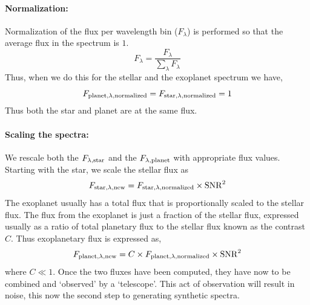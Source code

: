 \paragraph{Normalization:}
Normalization of the flux per wavelength bin ($F_\lambda$) is performed so that the average flux in the spectrum is $1$.
\begin{equation}
    F_\lambda = \dfrac{F_\lambda}{\sum\limits_{\lambda} F_{\lambda}}
\end{equation}
Thus, when we do this for the stellar and the exoplanet spectrum we have,
\begin{equation}
     F_{\rm{planet,\lambda,normalized}} =  F_{\rm{star},\lambda,normalized} = 1
\end{equation}
Thus both the star and planet are at the same flux. 
\paragraph{Scaling the spectra:}
We rescale both the $F_{\rm{\lambda,star}}$ and the $F_{\rm{\lambda,planet}}$ with appropriate flux values.
Starting with the star, we scale the stellar flux as
\begin{equation}
    F_{\rm{star,\lambda,new}} = F_{\rm{star,\lambda,normalized}}\times\rm{SNR}^2
    \label{eq:scaling of F}
\end{equation}
The exoplanet usually has a total flux that is proportionally scaled to the stellar flux.
The flux from the exoplanet is just a fraction of the stellar flux, expressed usually as a ratio of total planetary flux to the stellar flux known as the contrast $C$.
Thus exoplanetary flux is expressed as,
\begin{equation}
    F_{\rm{planet},\lambda,new} = C\times F_{\rm{planet},\lambda,normalized}\times \rm{SNR}^2
    \label{eq:exoplanet flux}
\end{equation}
where $C\ll1$.
Once the two fluxes have been computed, they have now to be combined and `observed' by a `telescope'.
This act of observation will result in noise, this now the second step to generating synthetic spectra.
